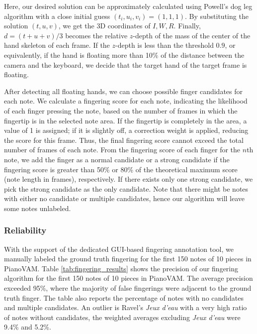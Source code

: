 \documentclass{article}
\begin{document}
Here, our desired solution can be approximately calculated using Powell's dog leg algorithm with a close initial guess $(t_i,u_i,v_i)=(1,1,1)$. By substituting the solution $(t,u,v)$, we get the 3D coordinates of $I,W,R$.  Finally, $d=(t+u+v)/3$ becomes the relative $z$-depth of the mass of the center of the hand skeleton of each frame. If the $z$-depth is less than the threshold $0.9$, or equivalently, if the hand is floating more than 10\% of the distance between the camera and the keyboard, we decide that the target hand of the target frame is floating.


After detecting all floating hands, we can choose possible finger candidates for each note. We calculate a fingering score for each note, indicating the likelihood of each finger pressing the note, based on the number of frames in which the fingertip is in the selected note area. If the fingertip is completely in the area, a value of 1 is assigned; if it is slightly off, a correction weight is applied, reducing the score for this frame. Thus, the final fingering score cannot exceed the total number of frames of each note. From the fingering score of each finger for the $n$th note, we add the finger as a normal candidate or a strong candidate if the fingering score is greater than 50\% or 80\% of the theoretical maximum score (note length in frames), respectively. If there exists only one strong candidate, we pick the strong candidate as the only candidate. Note that there might be notes with either no candidate or multiple candidates, hence our algorithm will leave some notes unlabeled.

\subsubsection{Reliability}
With the support of the dedicated GUI-based fingering annotation tool, we manually labeled the ground truth fingering for the first 150 notes of 10 pieces in PianoVAM. Table \ref{tab:fingering_results} shows the precision of our fingering algorithm for the first 150 notes of 10 pieces in PianoVAM. The average precision exceeded 95\%, where the majority of false fingerings were adjacent to the ground truth finger. The table also reports the percentage of notes with no candidates and multiple candidates. %
An outlier is Ravel's \textit{Jeux d'eau} with a very high ratio of notes without candidates, the weighted averages excluding \textit{Jeux d'eau} were 9.4\% and 5.2\%.
\end{document}
